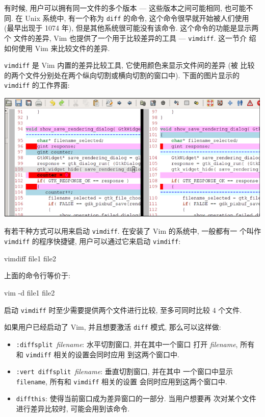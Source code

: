 有时候, 用户可以拥有同一文件的多个版本 --- 这些版本之间可能相同, 也可能不同.
在 Unix 系统中, 有一个称为 \texttt{diff} 的命令, 这个命令很早就开始被人们使用
(最早出现于 1074 年), 但是其他系统很可能没有该命令. 这个命令的功能是显示两个
文件的差异, Vim 也提供了一个用于比较差异的工具 --- \texttt{vimdiff}. 这一节介
绍如何使用 Vim 来比较文件的差异.

\texttt{vimdiff} 是 Vim 内置的差异比较工具, 它使用颜色来显示文件间的差异 (被
比较的两个文件分别处在两个纵向切割或横向切割的窗口中). 下面的图片显示的
\texttt{vimdiff} 的工作界面:
\begin{center}
    \includegraphics[scale=0.7]{./images/page112.png}
\end{center}

有若干种方式可以用来启动 \texttt{vimdiff}. 在安装了 Vim 的系统中, 一般都有一
个叫作 \texttt{vimdiff} 的程序快捷键, 用户可以通过它来启动 \texttt{vimdiff}:
\begin{vimcode}
vimdiff file1 file2
\end{vimcode}
上面的命令行等价于:
\begin{vimcode}
vim -d file1 file2
\end{vimcode}

启动 \texttt{vimdiff} 时至少需要提供两个文件进行比较, 至多可同时比较 4 个文件.

如果用户已经启动了 Vim, 并且想要激活 \texttt{diff} 模式, 那么可以这样做:
\begin{itemize}
    \item \texttt{:diffsplit }\textit{filename}: 水平切割窗口, 并在其中一个窗口
        打开 \textit{filename}, 所有和 \texttt{vimdiff} 相关的设置会同时应用
        到这两个窗口中.
    \item \texttt{:vert diffsplit }\textit{filename}: 垂直切割窗口, 并在其中
        一个窗口中显示 \texttt{filename}, 所有和 \texttt{vimdiff} 相关的设置
        会同时应用到这两个窗口中.
    \item \texttt{diffthis}: 使得当前窗口成为差异窗口的一部分. 当用户想要再
        次对某个文件进行差异比较时, 可能会用到该命令.
\end{itemize}

